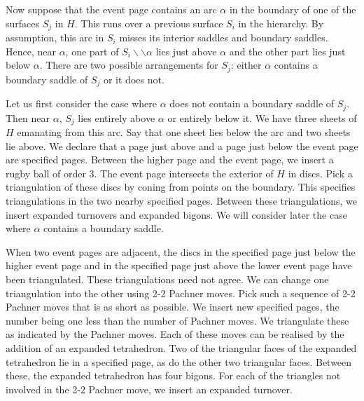 \documentclass[oneside]{amsart}
\numberwithin{equation}{section}
\theoremstyle{plain}
\theoremstyle{definition}
\newcommand{\cut}{\backslash\backslash}
\begin{document}
Now suppose that the event page contains an arc $\alpha$ in the boundary of one of the surfaces $S_j$
in $H$. This runs over a previous surface $S_i$ in the hierarchy. By assumption, this arc in $S_i$
misses its interior saddles and boundary saddles. Hence, near $\alpha$, one part of $S_i \cut \alpha$ lies
just above $\alpha$ and the other part lies just below $\alpha$. There are two possible arrangements
for $S_j$: either $\alpha$ contains a boundary saddle of $S_j$ or it does not. 

Let us first consider the case where $\alpha$ does not contain a boundary saddle of $S_j$. Then
near $\alpha$, $S_j$ lies entirely above $\alpha$ or entirely below it.
We have three sheets of $H$ emanating from this arc. Say that one sheet
lies below the arc and two sheets lie above. We declare that a page just above
and a page just below the event page are specified pages. Between the higher page 
and the event page, we insert a rugby ball of order $3$.
The event page intersects the exterior of $H$ in discs. Pick a triangulation of
these discs by coning from points on the boundary. This specifies triangulations in the two nearby specified pages.
Between these triangulations, we insert expanded turnovers and expanded bigons.
We will consider later the case where $\alpha$ contains a boundary saddle.

When two event pages are adjacent, the discs in the specified page just below the higher event page
and in the specified page just above the lower event page have been triangulated.
These triangulations need not agree. We can change one triangulation into the other
using 2-2 Pachner moves. Pick such a sequence of 2-2 Pachner moves that is
as short as possible. We insert new specified pages, the number being
one less than the number of Pachner moves. We triangulate these as indicated
by the Pachner moves. Each of these moves can be realised by the addition of 
an expanded tetrahedron. Two of the triangular faces of the expanded tetrahedron
lie in a specified page, as do the other two triangular faces. Between these,
the expanded tetrahedron has four bigons. For each of the triangles 
not involved in the 2-2 Pachner move, we insert an expanded turnover.
\end{document}

